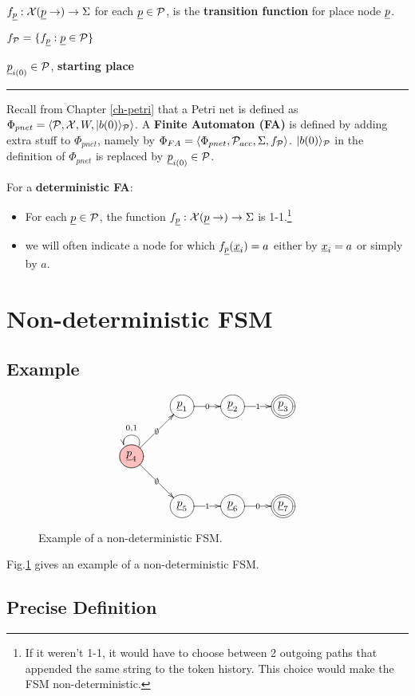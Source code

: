 $f_\rvp:\calx(\rvp\rarrow)\rarrow \Sigma$ for each
$\rvp\in \calp$,  is the 
{\bf transition function} for place node $\rvp$. 

$f_\calp =
\{f_\rvp: \rvp\in \calp\}$

$\rvp_{i(0)}\in \calp$, {\bf starting place }
\hrule
Recall from Chapter \ref{ch-petri} that a Petri net is defined as $\Phi_{pnet} = \left\langle{\cal P}, {\cal X}, W,|b(0)\rangle_{\cal P}\right\rangle$.
A {\bf Finite Automaton (FA)}
is defined by adding extra stuff to
$\Phi_{pnet}$, namely by
$\Phi_{FA}=\left\langle\Phi_{pnet},{\cal P}_{acc}, \Sigma, f_{\cal P}\right\rangle$.
$|b(0)\rangle_{\cal P}$ in the definition
of $\Phi_{pnet}$ is replaced by
$\rvp_{i(0)}\in\calp$.

\begin{mdframed}[hidealllines=true,backgroundcolor=blue!10]
For a {\bf deterministic FA}:
\begin{itemize}
\item For each $\rvp\in\calp$, the function $f_\rvp:\calx(\rvp\rarrow)\rarrow \Sigma$ is 1-1.\footnote{If it weren't 1-1,
it would have to choose 
between 2 outgoing paths
that appended the same string to the token history.
This choice would make
the FSM non-deterministic.}

\item
we will often indicate a node for 
which $f_{\rvp}(\rvx_i)=a$ either by $\rvx_i=a$
or simply by $a$. 
\end{itemize}\end{mdframed}

\section{Non-deterministic FSM}
\subsection{Example}

\begin{figure}
$$
\xymatrix{
&\Circle{\rvp_1}\ar[r]|0
&\Circle{\rvp_2}\ar[r]|1
&\DCircle{\rvp_3}
\\
\PinkCircle{\rvp_4}\ar@(ru,lu)[]_{0,1}
\ar[ru]|\emptyset
\ar[rd]|\emptyset
\\
&\Circle{\rvp_5}\ar[r]|1
&\Circle{\rvp_6}\ar[r]|0
&\DCircle{\rvp_7}
}
$$
\caption{
Example of a 
non-deterministic FSM.}
\label{fig-non-det-fsm}
\end{figure}
Fig.\ref{fig-non-det-fsm}
gives an example of a non-deterministic
FSM.


\subsection{Precise Definition}

